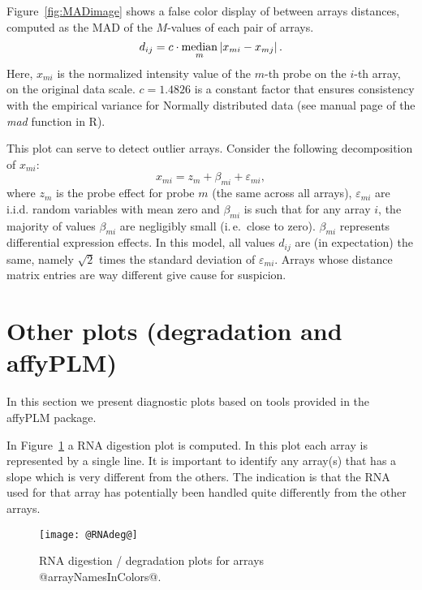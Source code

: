 \documentclass[11pt]{article}
\newcommand{\Rpackage}[1]{{\textsf{#1}}}
\begin{document}
Figure~\ref{fig:MADimage} shows a false color display of between arrays
distances, computed as the MAD of the $M$-values of each pair of
arrays.
\begin{equation*}
d_{ij} = c\cdot \displaystyle \operatornamewithlimits{median}_{m} 
  \left| x_{mi}- x_{mj}\right|.
\end{equation*}
Here, $x_{mi}$ is the normalized intensity value of the $m$-th probe
on the $i$-th array, on the original data scale. $c=1.4826$ is a constant factor
that ensures consistency with the empirical variance for Normally
distributed data (see manual page of the \textit{mad} function in R).
 
This plot can serve to detect outlier arrays.
Consider the following decomposition of $x_{mi}$:
\begin{equation}
x_{mi}= z_m + \beta_{mi} + \varepsilon_{mi},
\end{equation}
where $z_m$ is the probe effect for probe $m$ (the same across all
arrays), $\varepsilon_{mi}$ are i.i.d. random variables with mean zero
and $\beta_{mi}$ is such that for any array $i$, the majority of values
$\beta_{mi}$ are negligibly small (i.\,e.\ close to zero).
$\beta_{mi}$ represents differential expression effects.  In this
model, all values $d_{ij}$ are (in expectation) the same, namely
$\sqrt{2}$ times the standard deviation of $\varepsilon_{mi}$.  Arrays
whose distance matrix entries are way different give cause for
suspicion.

\section{Other plots (degradation and affyPLM)}

In this section we present diagnostic plots based on tools provided
in the \Rpackage{affyPLM} package.

In Figure~\ref{fig:rnadeg} a RNA digestion plot is computed. In this plot
each array is represented by a single line. It is important to identify 
any array(s) that has a slope which is very different from the others. 
The indication is that the RNA used for that array has potentially 
been handled quite differently from the other arrays. 

\begin{figure}[tp]
  \centering
\texttt{[image: @RNAdeg@]}
\caption{\label{fig:rnadeg}%
RNA digestion / degradation plots for arrays @arrayNamesInColors@.}
\end{figure}
\end{document}
